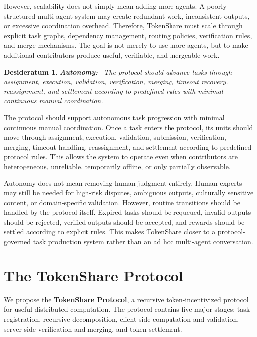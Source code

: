 \documentclass{article}
\theoremstyle{plain}
\newtheorem{desideratum}{Desideratum}
\begin{document}
However, scalability does not simply mean adding more agents. A poorly structured multi-agent system may create redundant work, inconsistent outputs, or excessive coordination overhead. Therefore, TokenShare must scale through explicit task graphs, dependency management, routing policies, verification rules, and merge mechanisms. The goal is not merely to use more agents, but to make additional contributors produce useful, verifiable, and mergeable work.


\begin{desideratum}
\textbf{Autonomy:}~ The protocol should advance tasks through assignment, execution, validation, verification, merging, timeout recovery, reassignment, and settlement according to predefined rules with minimal continuous manual coordination.
\end{desideratum}

The protocol should support autonomous task progression with minimal continuous manual coordination. Once a task enters the protocol, its units should move through assignment, execution, validation, submission, verification, merging, timeout handling, reassignment, and settlement according to predefined protocol rules. This allows the system to operate even when contributors are heterogeneous, unreliable, temporarily offline, or only partially observable.

Autonomy does not mean removing human judgment entirely. Human experts may still be needed for high-risk disputes, ambiguous outputs, culturally sensitive content, or domain-specific validation. However, routine transitions should be handled by the protocol itself. Expired tasks should be requeued, invalid outputs should be rejected, verified outputs should be accepted, and rewards should be settled according to explicit rules. This makes TokenShare closer to a protocol-governed task production system rather than an ad hoc multi-agent conversation.



\section{The TokenShare Protocol}

We propose the \textbf{TokenShare Protocol}, a recursive token-incentivized protocol for useful distributed computation. The protocol contains five major stages: task registration, recursive decomposition, client-side computation and validation, server-side verification and merging, and token settlement.
\end{document}
